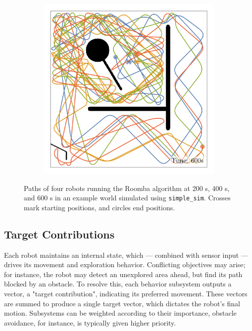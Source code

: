 \begin{figure}[H]
\begin{subfigure}[b]{\w}
    \end{subfigure}
    \begin{subfigure}[b]{\w}
        \centering
        \includegraphics[width=\textwidth]{./figures/plots/paths/avoid-obstacles-paths-(after-600s).png}
    \end{subfigure}
    \caption{Paths of four robots running the Roomba algorithm at 200 s, 400 s, and 600 s in an example world simulated using \texttt{simple\_sim}. Crosses mark starting positions, and circles end positions.}
    \label{fig:roomba-paths}
\end{figure}

\subsection{Target Contributions}
Each robot maintains an internal state, which --- combined with sensor input --- drives its movement and exploration behavior. Conflicting objectives may arise; for instance, the robot may detect an unexplored area ahead, but find its path blocked by an obstacle. To resolve this, each behavior subsystem outputs a vector, a "target contribution", indicating its preferred movement. These vectors are summed to produce a single target vector, which dictates the robot’s final motion. Subsystems can be weighted according to their importance, obstacle avoidance, for instance, is typically given higher priority.

